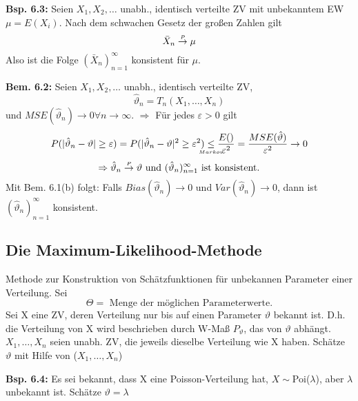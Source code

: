 \documentclass[a4paper,11pt]{article}
\begin{document}
\vspace{6pt}
\noindent\textbf{Bsp. 6.3:}
Seien $X_1,X_2,\dots$ unabh., identisch verteilte ZV mit unbekanntem EW $\mu=E(X_i)$. 
Nach dem schwachen Gesetz der großen Zahlen gilt 
\[\bar{X}_n \overset{\mathclap{\scriptscriptstyle P}}{\rightarrow} \mu\]
Also ist die Folge $(\bar{X}_n)_{n=1}^\infty$ konsistent für $\mu$. 

\vspace{6pt}
\noindent\textbf{Bem. 6.2:} Seien $X_1,X_2,\dots$ unabh., identisch verteilte ZV, 
\[\hat{\vartheta}_n=T_n(X_1,\dots,X_n)\]
und $MSE(\hat{\vartheta}_n)\rightarrow0 \forall n\rightarrow\infty$. 
\newline $\Rightarrow$ Für jedes $\varepsilon>0$ gilt 
\[P(|\hat{\vartheta}_n-\vartheta|\geq\varepsilon)=P(|\hat{\vartheta}_n-\vartheta|^2\geq\varepsilon^2)\underset{\mathclap{\scriptscriptstyle Markov}}{\leq}\frac{E()}{\varepsilon^2}=\frac{MSE(\hat{\vartheta})}{\varepsilon^2}\rightarrow0\]
\[\Rightarrow\hat{\vartheta}_n\overset{\mathclap{\scriptscriptstyle P}}{\rightarrow}\vartheta \text{ und } (\hat{\vartheta}_n)_{n=1}^\infty \text{ ist konsistent.}\]
\noindent Mit Bem. 6.1(b) folgt:
\newline Falls $Bias(\hat{\vartheta}_n)\rightarrow0$ und $Var(\hat{\vartheta}_n)\rightarrow0$, dann ist $(\hat{\vartheta}_n)_{n=1}^\infty$ konsistent. 

\subsection{Die Maximum-Likelihood-Methode}
Methode zur Konstruktion von Schätzfunktionen für unbekannen Parameter einer Verteilung.
Sei 
\[\Theta = \text{ Menge der möglichen Parameterwerte.}\]
Sei X eine ZV, deren Verteilung nur bis auf einen Parameter $\vartheta$ bekannt ist. D.h. die Verteilung von X wird beschrieben durch W-Maß $P_\vartheta$, das von $\vartheta$ abhängt. 
\newline $X_1,\dots,X_n$ seien unabh. ZV, die jeweils dieselbe Verteilung wie X haben. Schätze $\vartheta$ mit Hilfe von ($X_1,\dots,X_n$)

\vspace{6pt}
\noindent\textbf{Bsp. 6.4:}
Es sei bekannt, dass X eine Poisson-Verteilung hat, 
$X\sim$Poi($\lambda$), aber $\lambda$ unbekannt ist. 
\newline Schätze $\vartheta=\lambda$
\end{document}
